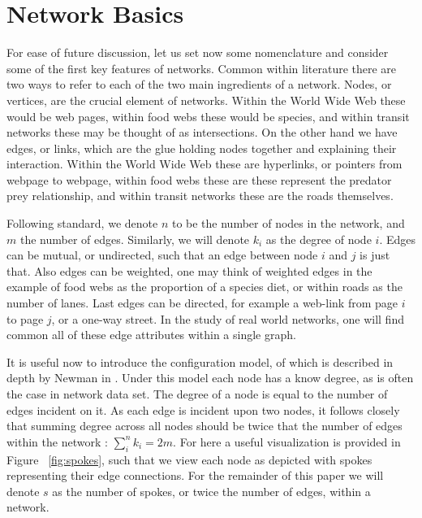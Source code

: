 \documentclass[a4paper, 12pt, twocolumn]{article}
\begin{document}
\section{Network Basics}

For ease of future discussion, let us set now some nomenclature and consider some of the first key features of networks.
Common within literature there are two ways to refer to each of the two main ingredients of a network.
Nodes, or vertices, are the crucial element of networks.
Within the World Wide Web these would be web pages, within food webs these would be species, and within transit networks these may be thought of as intersections.
On the other hand we have edges, or links, which are the glue holding nodes together and explaining their interaction.
Within the World Wide Web these are hyperlinks, or pointers from webpage to webpage, within food webs these are these represent the predator prey relationship, and within transit networks these are the roads themselves.

Following standard, we denote $ n $ to be the number of nodes in the network, and $ m $ the number of edges.
Similarly, we will denote $ k_i $ as the degree of node $ i $.
Edges can be mutual, or undirected, such that an edge between node $ i $ and $ j $ is just that.
Also edges can be weighted, one may think of weighted edges in the example of food webs as the proportion of a species diet, or within roads as the number of lanes.
Last edges can be directed, for example a web-link from page $ i $ to page $ j $, or a one-way street.
In the study of real world networks, one will find common all of these edge attributes within a single graph.

It is useful now to introduce the configuration model, of which is described in depth by Newman in \cite{networks}.
Under this model each node has a know degree, as is often the case in network data set.
The degree of a node is equal to the number of edges incident on it.
As each edge is incident upon two nodes, it follows closely that summing degree across all nodes should be twice that the number of edges within the network : $ \sum_{i}^{n} k_{i} = 2m $.
For here a useful visualization is provided in Figure ~\ref{fig:spokes}, such that we view each node as depicted with spokes representing their edge connections.
For the remainder of this paper we will denote $ s $ as the number of spokes, or twice the number of edges, within a network.

\vspace{10mm}
\end{document}
